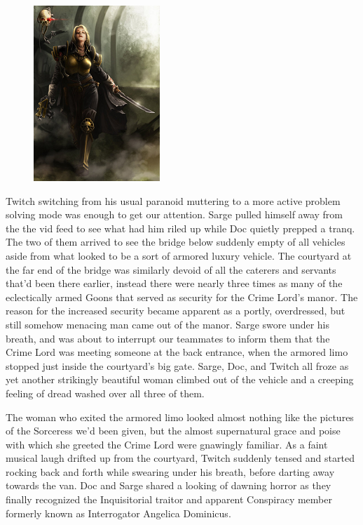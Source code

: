 \begin{figure}
	\begin{center}
		\includegraphics[width=\figwidth]{pics/18/51.png}
	\end{center}
\end{figure}
Twitch switching from his usual paranoid muttering to a more active problem solving mode was enough to get our attention. 
Sarge pulled himself away from the the vid feed to see what had him riled up while Doc quietly prepped a tranq. 
The two of them arrived to see the bridge below suddenly empty of all vehicles aside from what looked to be a sort of armored luxury vehicle. 
The courtyard at the far end of the bridge was similarly devoid of all the caterers and servants that'd been there earlier, instead there were nearly three times as many of the eclectically armed Goons that served as security for the Crime Lord's manor. 
The reason for the increased security became apparent as a portly, overdressed, but still somehow menacing man came out of the manor. 
Sarge swore under his breath, and was about to interrupt our teammates to inform them that the Crime Lord was meeting someone at the back entrance, when the armored limo stopped just inside the courtyard's big gate. 
Sarge, Doc, and Twitch all froze as yet another strikingly beautiful woman climbed out of the vehicle and a creeping feeling of dread washed over all three of them.

The woman who exited the armored limo looked almost nothing like the pictures of the Sorceress we'd been given, but the almost supernatural grace and poise with which she greeted the Crime Lord were gnawingly familiar. 
As a faint musical laugh drifted up from the courtyard, Twitch suddenly tensed and started rocking back and forth while swearing under his breath, before darting away towards the van. 
Doc and Sarge shared a looking of dawning horror as they finally recognized the Inquisitorial traitor and apparent Conspiracy member formerly known as Interrogator Angelica Dominicus. 


